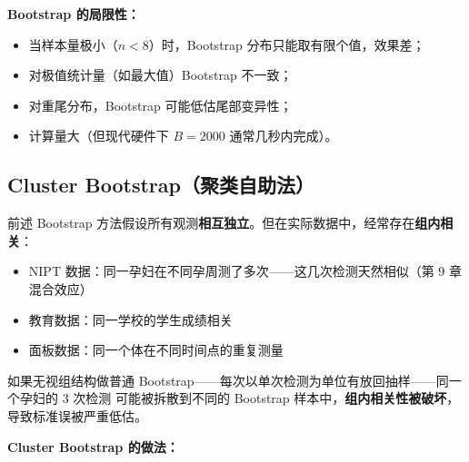 \textbf{Bootstrap 的局限性：}
\begin{itemize}
    \item 当样本量极小（$n < 8$）时，Bootstrap 分布只能取有限个值，效果差；
    \item 对极值统计量（如最大值）Bootstrap 不一致；
    \item 对重尾分布，Bootstrap 可能低估尾部变异性；
    \item 计算量大（但现代硬件下 $B=2000$ 通常几秒内完成）。
\end{itemize}

\subsection{Cluster Bootstrap（聚类自助法）}

前述 Bootstrap 方法假设所有观测\textbf{相互独立}。但在实际数据中，经常存在\textbf{组内相关}：

\begin{itemize}
    \item NIPT 数据：同一孕妇在不同孕周测了多次——这几次检测天然相似（第 9 章混合效应）
    \item 教育数据：同一学校的学生成绩相关
    \item 面板数据：同一个体在不同时间点的重复测量
\end{itemize}

如果无视组结构做普通 Bootstrap——每次以单次检测为单位有放回抽样——同一个孕妇的 3 次检测
可能被拆散到不同的 Bootstrap 样本中，\textbf{组内相关性被破坏}，导致标准误被严重低估。

\medskip
\textbf{Cluster Bootstrap 的做法：}

\begin{center}
\end{center}

